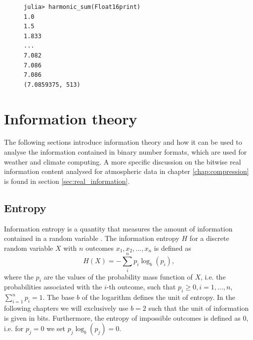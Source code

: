 \begin{figure}[tbhp]
\begin{lstlisting}[language=JuliaLocal, label=lst:harmonic_sum_float16print, caption={\textbf{Analysing the function \texttt{harmonic\_sum} with the
new custom number format \texttt{Float16print}.} Executing \texttt{harmonic\_sum} with \texttt{Float16print} triggers a \texttt{print} statement
on every addition, i.e. after every term of the harmonic sum, but any other additional code can be executed too. Analysis number formats can
be used to investigate even complicated algorithms without explicitly changing them.}]
julia> harmonic_sum(Float16print)
1.0
1.5
1.833
...
7.082
7.086
7.086
(7.0859375, 513)
\end{lstlisting}
\end{figure}

\section{Information theory}
\label{sec:information}

The following sections introduce information theory and how it can be used to analyse the information contained in binary number formats,
which are used for weather and climate computing. A more specific discussion on the bitwise real information content analysed for
atmospheric data in chapter \ref{chap:compression} is found in section \ref{sec:real_information}.

\subsection{Entropy}
\label{sec:entropy}

Information entropy is a quantity that measures the amount of information contained in a random variable \citep{Shannon1948,MacKay2003}.
The information entropy $H$ for a discrete random variable $X$ with $n$ outcomes $x_1,x_2,...,x_n$ is defined as 
\begin{equation}
    H(X) = - \sum_i^n p_i \log_b(p_i)\text{,}
    \label{eq:entropy}
\end{equation}
where the $p_i$ are the values of the probability mass function of $X$, i.e. the probabilities associated with the $i$-th outcome,
such that $p_i \geq 0, i = 1,...,n$, $\sum_{i=1}^n p_i = 1$. The base $b$ of the logarithm defines the unit of entropy. In the following
chapters we will exclusively use $b=2$ such that the unit of information is given in bits. Furthermore, the entropy of impossible
outcomes is defined as $0$, i.e. for $p_j = 0$ we set $p_j \log_b(p_j) = 0$.

